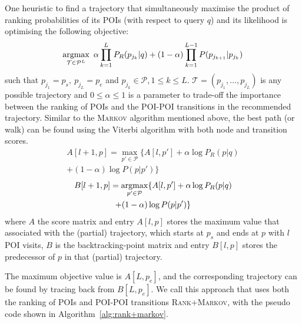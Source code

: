 One heuristic to find a trajectory that simultaneously maximise the product of ranking probabilities
of its POIs (with respect to query $q$) and its likelihood is optimising the following objective:
\begin{equation*}
    \operatorname*{argmax}_{\mathcal{T} \in \mathcal{P}^L} ~\alpha \prod_{k=1}^{L} P_R(p_{j_k} | q) +
                                     (1-\alpha) \prod_{k=1}^{L-1} P(p_{j_{k+1}} | p_{j_k})
\end{equation*}
such that
$p_{j_1} = p_s, ~ p_{j_L} = p_e$ and
$p_{j_k} \in \mathcal{P}, 1 \le k \le L$.
$\mathcal{T} = (p_{j_1}, \dots, p_{j_L})$ is any possible trajectory and
$0 \le \alpha \le 1$ is a parameter to trade-off the importance between the ranking of POIs
and the POI-POI transitions in the recommended trajectory.
Similar to the \textsc{Markov} algorithm mentioned above, 
the best path (or walk) can be found using the Viterbi algorithm with both node and transition scores. 
\begin{multline}
    \label{eq:max}
    A[l+1, p] = \max_{p' \in \mathcal{P}} \{ A[l, p'] + \alpha \log P_R(p|q) \\ + (1-\alpha) \log P(p|p') \}
\end{multline}
\begin{multline}
    \label{eq:argmax}
    B[l+1, p] = \operatorname*{argmax}_{p' \in \mathcal{P}} \{ A[l, p'] + \alpha \log P_R(p|q) \\ + (1-\alpha) \log P(p|p') \}
\end{multline}
where $A$ the score matrix and entry $A[l, p]$ stores the maximum value that associated with the (partial) trajectory, 
which starts at $p_s$ and ends at $p$ with $l$ POI visits,
$B$ is the backtracking-point matrix and entry $B[l, p]$ stores the predecessor of $p$ in that (partial) trajectory.

The maximum objective value is $A[L, p_e]$,
and the corresponding trajectory can be found by tracing back from $B[L, p_e]$.
We call this approach that uses both the ranking of POIs and POI-POI transitions \textsc{Rank+Markov},
with the pseudo code shown in Algorithm~\ref{alg:rank+markov}.

